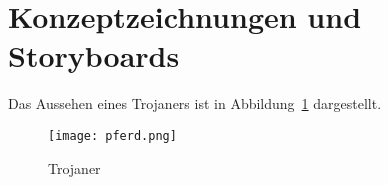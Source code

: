 \section{Konzeptzeichnungen und Storyboards}



Das Aussehen eines Trojaners ist in Abbildung~\ref{fig:pferd} dargestellt.

\begin{figure}[ht]
	\centering
	\texttt{[image: pferd.png]}
	\caption{Trojaner}
	\label{fig:pferd}
\end{figure}
